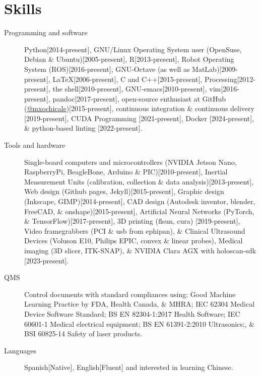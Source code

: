 \documentclass{mycv}
\begin{document}
\section{Skills}
\begin{description}

\item[Programming and software] Python[2014-present],
GNU/Linux Operating System user (OpenSuse, Debian \& Ubuntu)[2005-present], 
R[2013-present], 
Robot Operating System (ROS)[2016-present],
GNU-Octave (as well as MatLab)[2009-present],
\LaTeX [2006-present], 
C and C++[2015-present],
Processing[2012-present], 
the shell[2010-present], 
GNU-emacs[2010-present],
vim[2016-present], 
pandoc[2017-present],
open-source enthusiast at GitHub (\href{https://github.com/mxochicale}{@mxochicale})[2015-present], 
continuous integration \& continuous delivery [2019-present], 
CUDA Programming [2021-present], 
Docker [2024-present], \&
python-based linting [2022-present].

\item[Tools and hardware] 
Single-board computers and microcontrollers (NVIDIA Jetson Nano, RaspberryPi, BeagleBone, Arduino \& PIC)[2010-present],
Inertial Measurement Units (calibration, collection \& data analysis)[2013-present], 
Web design (Github pages, Jekyll)[2015-present], 
Graphic design (Inkscape, GIMP)[2014-present],
CAD design (Autodesk inventor, blender, FreeCAD, \& onshape)[2015-present], 
Artificial Neural Networks (PyTorch, \& TensorFlow)[2017-present], 
3D printing (flsun, cura) [2019-present], 
Video framegrabbers (PCI \& usb from ephipan), \& 
Clinical Ultrasound Devices (Voluson E10, Philips EPIC, convex \& linear probes), 
Medical imaging (3D slicer, ITK-SNAP), \& 
NVIDIA Clara AGX with holoscan-sdk [2023-present].

\item[QMS] 
Control documents with standard compliances using:
Good Machine Learning Practice by FDA, Health Canada, \& MHRA;
IEC 62304 Medical Device Software Standard;
BS EN 82304-1:2017 Health Software;
IEC 60601-1 Medical electrical equipment; 
BS EN 61391-2:2010 Ultrasonics;, \&
BSI 60825-14 Safety of laser products.

\item[Languages] Spanish[Native], English[Fluent] and interested in learning Chinese.
 
\end{description}

\end{document}
